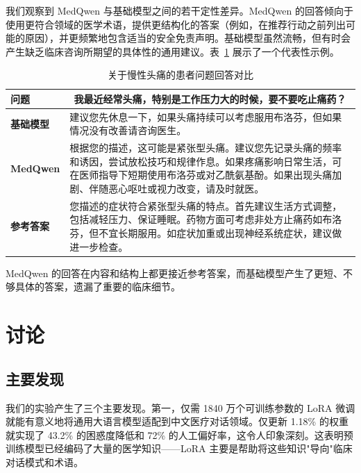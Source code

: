 \documentclass[12pt,a4paper]{article}
\begin{document}
我们观察到 MedQwen 与基础模型之间的若干定性差异。MedQwen 的回答倾向于使用更符合领域的医学术语，提供更结构化的答案（例如，在推荐行动之前列出可能的原因），并更频繁地包含适当的安全免责声明。基础模型虽然流畅，但有时会产生缺乏临床咨询所期望的具体性的通用建议。表~\ref{tab:qualitative} 展示了一个代表性示例。

\begin{table}[ht]
\centering
\caption{关于慢性头痛的患者问题回答对比}
\label{tab:qualitative}
\begin{tabular}{p{2.2cm}p{11.5cm}}
\toprule
\textbf{问题} & \multicolumn{1}{c}{\textbf{我最近经常头痛，特别是工作压力大的时候，要不要吃止痛药？}} \\
\midrule
\textbf{基础模型} & 建议您先休息一下，如果头痛持续可以考虑服用布洛芬，但如果情况没有改善请咨询医生。 \\
\midrule
\textbf{MedQwen} & 根据您的描述，这可能是紧张型头痛。建议您先记录头痛的频率和诱因，尝试放松技巧和规律作息。如果疼痛影响日常生活，可在医师指导下短期使用布洛芬或对乙酰氨基酚。如果出现头痛加剧、伴随恶心呕吐或视力改变，请及时就医。 \\
\midrule
\textbf{参考答案} & 您描述的症状符合紧张型头痛的特点。首先建议生活方式调整，包括减轻压力、保证睡眠。药物方面可考虑非处方止痛药如布洛芬，但不宜长期服用。如症状加重或出现神经系统症状，建议做进一步检查。 \\
\bottomrule
\end{tabular}
\end{table}

MedQwen 的回答在内容和结构上都更接近参考答案，而基础模型产生了更短、不够具体的答案，遗漏了重要的临床细节。

\section{讨论}
\label{sec:discussion}

\subsection{主要发现}

我们的实验产生了三个主要发现。第一，仅需 1840 万个可训练参数的 LoRA 微调就能有意义地将通用大语言模型适配到中文医疗对话领域。仅更新 1.18\% 的权重就实现了 43.2\% 的困惑度降低和 72\% 的人工偏好率，这令人印象深刻。这表明预训练模型已经编码了大量的医学知识——LoRA 主要是帮助将这些知识"导向"临床对话模式和术语。
\end{document}
